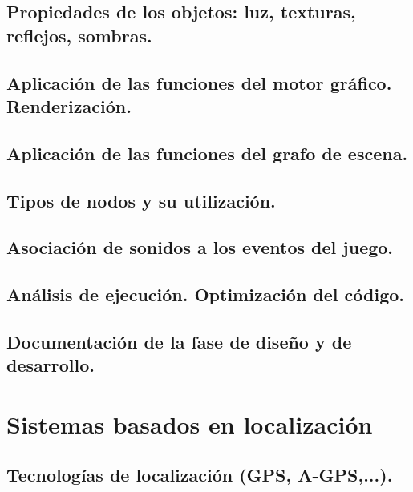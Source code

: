 \documentclass[a4paper,12pt,spanish]{sphinxmanual}
\begin{document}
\section{Propiedades de los objetos: luz, texturas, reflejos, sombras.}
\label{index:propiedades-de-los-objetos-luz-texturas-reflejos-sombras}

\section{Aplicación de las funciones del motor gráfico. Renderización.}
\label{index:aplicacion-de-las-funciones-del-motor-grafico-renderizacion}

\section{Aplicación de las funciones del grafo de escena.}
\label{index:aplicacion-de-las-funciones-del-grafo-de-escena}

\section{Tipos de nodos y su utilización.}
\label{index:tipos-de-nodos-y-su-utilizacion}

\section{Asociación de sonidos a los eventos del juego.}
\label{index:asociacion-de-sonidos-a-los-eventos-del-juego}

\section{Análisis de ejecución. Optimización del código.}
\label{index:analisis-de-ejecucion-optimizacion-del-codigo}

\section{Documentación de la fase de diseño y de desarrollo.}
\label{index:documentacion-de-la-fase-de-diseno-y-de-desarrollo}

\chapter{Sistemas basados en localización}
\label{index:sistemas-basados-en-localizacion}

\section{Tecnologías de localización (GPS, A-GPS,...).}
\label{index:tecnologias-de-localizacion-gps-a-gps}
\end{document}

